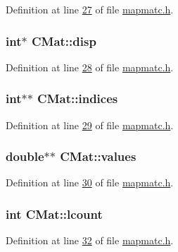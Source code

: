 Definition at line \hyperlink{mapmatc_8h_source_l00027}{27} of file \hyperlink{mapmatc_8h_source}{mapmatc.\-h}.

\hypertarget{structCMat_a7eb91e1b71eed5d46554741cc6f85337}{
\subsubsection[{disp}]{\setlength{\rightskip}{0pt plus 5cm}int$\ast$ C\-Mat\-::disp}}\label{structCMat_a7eb91e1b71eed5d46554741cc6f85337}


Definition at line \hyperlink{mapmatc_8h_source_l00028}{28} of file \hyperlink{mapmatc_8h_source}{mapmatc.\-h}.

\hypertarget{structCMat_a69c30ab5fc10323e476ca1d0fb5f49c2}{
\subsubsection[{indices}]{\setlength{\rightskip}{0pt plus 5cm}int$\ast$$\ast$ C\-Mat\-::indices}}\label{structCMat_a69c30ab5fc10323e476ca1d0fb5f49c2}


Definition at line \hyperlink{mapmatc_8h_source_l00029}{29} of file \hyperlink{mapmatc_8h_source}{mapmatc.\-h}.

\hypertarget{structCMat_a79ec69419609913aeb4f95d362c615c7}{
\subsubsection[{values}]{\setlength{\rightskip}{0pt plus 5cm}double$\ast$$\ast$ C\-Mat\-::values}}\label{structCMat_a79ec69419609913aeb4f95d362c615c7}


Definition at line \hyperlink{mapmatc_8h_source_l00030}{30} of file \hyperlink{mapmatc_8h_source}{mapmatc.\-h}.

\hypertarget{structCMat_a86a944fad57e8ca9dbe63e15e73ccb03}{
\subsubsection[{lcount}]{\setlength{\rightskip}{0pt plus 5cm}int C\-Mat\-::lcount}}\label{structCMat_a86a944fad57e8ca9dbe63e15e73ccb03}


Definition at line \hyperlink{mapmatc_8h_source_l00032}{32} of file \hyperlink{mapmatc_8h_source}{mapmatc.\-h}.


